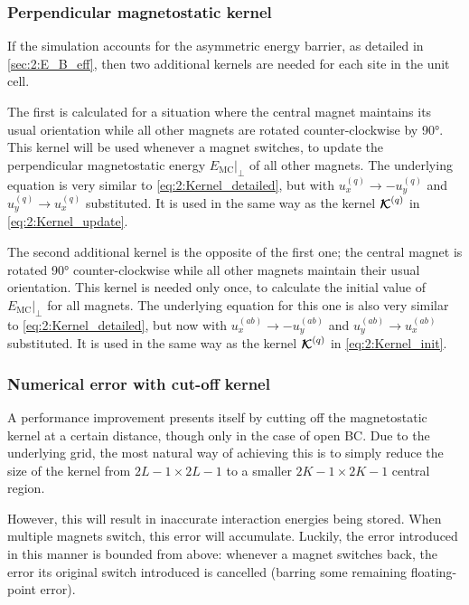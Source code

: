 \subsubsection{Perpendicular magnetostatic kernel} %
If the simulation accounts for the asymmetric energy barrier, as detailed in \cref{sec:2:E_B_eff}, then two additional kernels are needed for each site in the unit cell. \par
The first is calculated for a situation where the central magnet maintains its usual orientation while all other magnets are rotated counter-clockwise by \ang{90}.
This kernel will be used whenever a magnet switches, to update the perpendicular magnetostatic energy $\left. E_{\mathrm{MC}} \right|_{\perp}$ of all other magnets.
The underlying equation is very similar to \cref{eq:2:Kernel_detailed}, but with $u_x^{(q)} \rightarrow -u_y^{(q)}$ and $u_y^{(q)} \rightarrow u_x^{(q)}$ substituted.
It is used in the same way as the kernel $\boldsymbol{\mathbf{\mathcal{K}}}^{(q)}$ in \cref{eq:2:Kernel_update}. \par
The second additional kernel is the opposite of the first one; the central magnet is rotated \ang{90} counter-clockwise while all other magnets maintain their usual orientation.
This kernel is needed only once, to calculate the initial value of $\left. E_{\mathrm{MC}} \right|_{\perp}$ for all magnets.
The underlying equation for this one is also very similar to \cref{eq:2:Kernel_detailed}, but now with $u_x^{(ab)} \rightarrow -u_y^{(ab)}$ and $u_y^{(ab)} \rightarrow u_x^{(ab)}$ substituted.
It is used in the same way as the kernel $\boldsymbol{\mathbf{\mathcal{K}}}^{(q)}$ in \cref{eq:2:Kernel_init}.

\subsubsection{Numerical error with cut-off kernel} %
A performance improvement presents itself by cutting off the magnetostatic kernel at a certain distance, though only in the case of open BC.
Due to the underlying grid, the most natural way of achieving this is to simply reduce the size of the kernel from $2L-1 \times 2L-1$ to a smaller $2K-1 \times 2K-1$ central region. \par %
However, this will result in inaccurate interaction energies being stored.
When multiple magnets switch, this error will accumulate.
Luckily, the error introduced in this manner is bounded from above: whenever a magnet switches back, the error its original switch introduced is cancelled (barring some remaining floating-point error).

